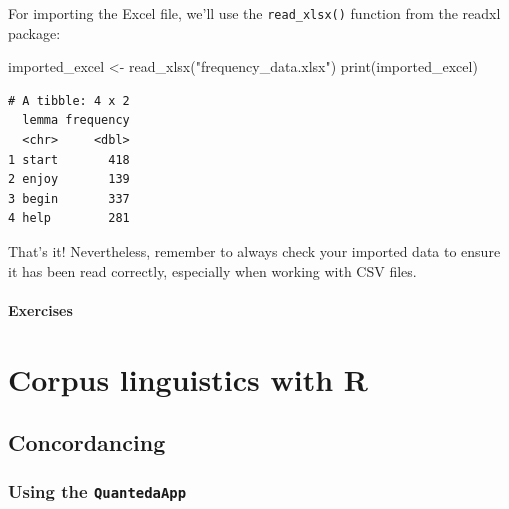 \documentclass[
  11pt,
  letterpaper,
  DIV=11,
  numbers=noendperiod]{scrreprt}
\newenvironment{Shaded}{\begin{snugshade}}{\end{snugshade}}
\newcommand{\FunctionTok}[1]{\textcolor[rgb]{0.28,0.35,0.67}{#1}}
\newcommand{\NormalTok}[1]{\textcolor[rgb]{0.00,0.23,0.31}{#1}}
\newcommand{\OtherTok}[1]{\textcolor[rgb]{0.00,0.23,0.31}{#1}}
\newcommand{\StringTok}[1]{\textcolor[rgb]{0.13,0.47,0.30}{#1}}
\begin{document}
\begin{tcolorbox}[enhanced jigsaw, toprule=.15mm, opacitybacktitle=0.6, coltitle=black, arc=.35mm, colback=white, title=\textcolor{quarto-callout-note-color}{\faInfo}\hspace{0.5em}{Import from Excel}, titlerule=0mm, toptitle=1mm, bottomtitle=1mm, breakable, rightrule=.15mm, opacityback=0, bottomrule=.15mm, leftrule=.75mm, colframe=quarto-callout-note-color-frame, left=2mm, colbacktitle=quarto-callout-note-color!10!white]

For importing the Excel file, we'll use the \texttt{read\_xlsx()}
function from the readxl package:

\begin{Shaded}
\begin{Highlighting}[]
\NormalTok{imported\_excel }\OtherTok{\textless{}{-}} \FunctionTok{read\_xlsx}\NormalTok{(}\StringTok{"frequency\_data.xlsx"}\NormalTok{)}
\FunctionTok{print}\NormalTok{(imported\_excel)}
\end{Highlighting}
\end{Shaded}

\begin{verbatim}
# A tibble: 4 x 2
  lemma frequency
  <chr>     <dbl>
1 start       418
2 enjoy       139
3 begin       337
4 help        281
\end{verbatim}

\end{tcolorbox}

That's it! Nevertheless, remember to always check your imported data to
ensure it has been read correctly, especially when working with CSV
files.

\subsection{Exercises}\label{exercises-2}

\part{Corpus linguistics with R}

\chapter{Concordancing}\label{concordancing}

\section{\texorpdfstring{Using the
\texttt{QuantedaApp}}{Using the QuantedaApp}}\label{using-the-quantedaapp}
\end{document}
